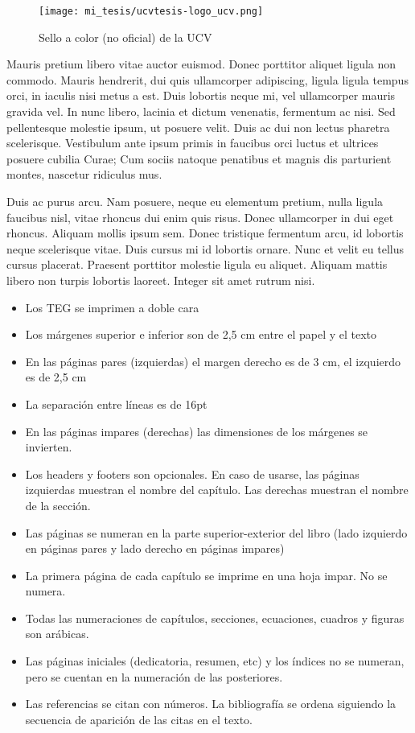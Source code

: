 \begin{figure}
\begin{center}
\texttt{[image: mi\_tesis/ucvtesis-logo\_ucv.png]}
\caption{Sello a color (no oficial) de la UCV \label{sellonoUCV}}
\end{center}
\end{figure}

Mauris pretium libero vitae auctor euismod. Donec porttitor aliquet ligula non commodo. Mauris hendrerit, dui quis ullamcorper adipiscing, ligula ligula tempus orci, in iaculis nisi metus a est. Duis lobortis neque mi, vel ullamcorper mauris gravida vel. In nunc libero, lacinia et dictum venenatis, fermentum ac nisi. Sed pellentesque molestie ipsum, ut posuere velit. Duis ac dui non lectus pharetra scelerisque. Vestibulum ante ipsum primis in faucibus orci luctus et ultrices posuere cubilia Curae; Cum sociis natoque penatibus et magnis dis parturient montes, nascetur ridiculus mus.

Duis ac purus arcu. Nam posuere, neque eu elementum pretium, nulla ligula faucibus nisl, vitae rhoncus dui enim quis risus. Donec ullamcorper in dui eget rhoncus. Aliquam mollis ipsum sem. Donec tristique fermentum arcu, id lobortis neque scelerisque vitae. Duis cursus mi id lobortis ornare. Nunc et velit eu tellus cursus placerat. Praesent porttitor molestie ligula eu aliquet. Aliquam mattis libero non turpis lobortis laoreet. Integer sit amet rutrum nisi.

\begin{itemize}
\item Los TEG se imprimen a doble cara 
\item Los márgenes superior e inferior son de 2,5 cm entre el papel y el texto 
\item En las páginas pares (izquierdas) el margen derecho es de 3 cm, el izquierdo es de 2,5 cm
\item La separaci\'on entre l\'ineas es de 16pt  
\item En las páginas impares (derechas) las dimensiones de los márgenes se invierten.
\item Los headers y footers son opcionales. En caso de usarse, las páginas izquierdas muestran el nombre del capítulo. Las derechas muestran el nombre de la sección.
\item Las páginas se numeran en la parte superior-exterior del libro (lado izquierdo en páginas pares y lado derecho en páginas impares)
\item La primera página de cada capítulo se imprime en una hoja impar. No se numera.
\item Todas las numeraciones de capítulos, secciones, ecuaciones, cuadros y figuras son arábicas. 
\item Las páginas iniciales (dedicatoria, resumen, etc) y los índices no se numeran, pero se cuentan en la numeración de las posteriores.
\item Las referencias se citan con números. La bibliografía se ordena siguiendo la secuencia de aparición de las citas en el texto.
\end{itemize}
